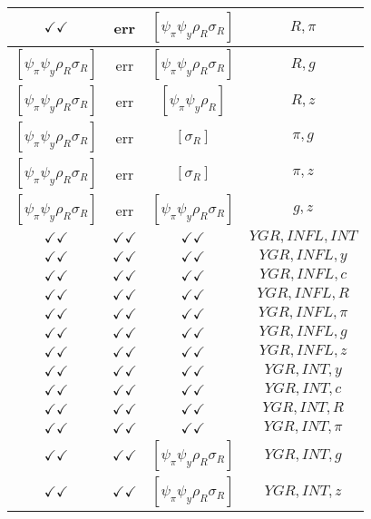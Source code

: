 \documentclass[a4paper,10pt]{article}
\begin{document}
\begin{longtable}{|c|c|c|c|}
\hline
$\checkmark\checkmark$ & err & $[\psi_\pi \psi_y \rho_R \sigma_R ]$ & ${R},{\pi}$ \\
\hline
$[\psi_\pi \psi_y \rho_R \sigma_R ]$ & err & $[\psi_\pi \psi_y \rho_R \sigma_R ]$ & ${R},{g}$ \\
\hline
$[\psi_\pi \psi_y \rho_R \sigma_R ]$ & err & $[\psi_\pi \psi_y \rho_R ]$ & ${R},{z}$ \\
\hline
$[\psi_\pi \psi_y \rho_R \sigma_R ]$ & err & $[\sigma_R ]$ & ${\pi},{g}$ \\
\hline
$[\psi_\pi \psi_y \rho_R \sigma_R ]$ & err & $[\sigma_R ]$ & ${\pi},{z}$ \\
\hline
$[\psi_\pi \psi_y \rho_R \sigma_R ]$ & err & $[\psi_\pi \psi_y \rho_R \sigma_R ]$ & ${g},{z}$ \\
\hline
$\checkmark\checkmark$ & $\checkmark\checkmark$ & $\checkmark\checkmark$ & ${YGR},{INFL},{INT}$ \\
\hline
$\checkmark\checkmark$ & $\checkmark\checkmark$ & $\checkmark\checkmark$ & ${YGR},{INFL},{y}$ \\
\hline
$\checkmark\checkmark$ & $\checkmark\checkmark$ & $\checkmark\checkmark$ & ${YGR},{INFL},{c}$ \\
\hline
$\checkmark\checkmark$ & $\checkmark\checkmark$ & $\checkmark\checkmark$ & ${YGR},{INFL},{R}$ \\
\hline
$\checkmark\checkmark$ & $\checkmark\checkmark$ & $\checkmark\checkmark$ & ${YGR},{INFL},{\pi}$ \\
\hline
$\checkmark\checkmark$ & $\checkmark\checkmark$ & $\checkmark\checkmark$ & ${YGR},{INFL},{g}$ \\
\hline
$\checkmark\checkmark$ & $\checkmark\checkmark$ & $\checkmark\checkmark$ & ${YGR},{INFL},{z}$ \\
\hline
$\checkmark\checkmark$ & $\checkmark\checkmark$ & $\checkmark\checkmark$ & ${YGR},{INT},{y}$ \\
\hline
$\checkmark\checkmark$ & $\checkmark\checkmark$ & $\checkmark\checkmark$ & ${YGR},{INT},{c}$ \\
\hline
$\checkmark\checkmark$ & $\checkmark\checkmark$ & $\checkmark\checkmark$ & ${YGR},{INT},{R}$ \\
\hline
$\checkmark\checkmark$ & $\checkmark\checkmark$ & $\checkmark\checkmark$ & ${YGR},{INT},{\pi}$ \\
\hline
$\checkmark\checkmark$ & $\checkmark\checkmark$ & $[\psi_\pi \psi_y \rho_R \sigma_R ]$ & ${YGR},{INT},{g}$ \\
\hline
$\checkmark\checkmark$ & $\checkmark\checkmark$ & $[\psi_\pi \psi_y \rho_R \sigma_R ]$ & ${YGR},{INT},{z}$ \\

\end{longtable}
\end{document}
